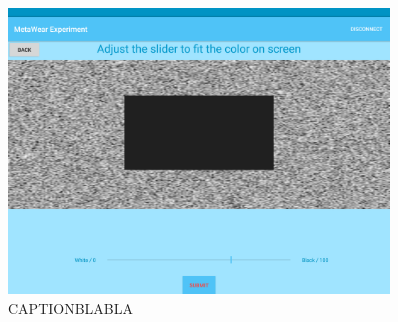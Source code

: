 \begin{figure}[h!]
\centering
\includegraphics[width=0.9\textwidth]{figures/tablet_screen18.png}
\caption{CAPTIONBLABLA}
\label{appendix_app_screen_18}
\end{figure}